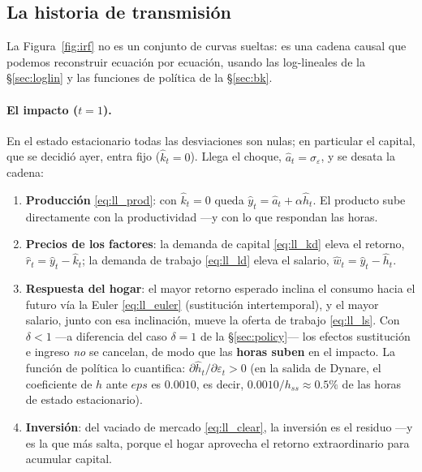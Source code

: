 \documentclass[11pt,a4paper]{report}
\begin{document}
\subsection{La historia de transmisión}

La Figura~\ref{fig:irf} no es un conjunto de curvas sueltas: es una cadena causal
que podemos reconstruir ecuación por ecuación, usando las log-lineales de la
\S\ref{sec:loglin} y las funciones de política de la \S\ref{sec:bk}.

\paragraph{El impacto ($t=1$).} En el estado estacionario todas las desviaciones
son nulas; en particular el capital, que se decidió ayer, entra fijo
($\hat{k}_t=0$). Llega el choque, $\hat{a}_t=\sigma_\varepsilon$, y se desata la
cadena:
\begin{enumerate}[label=(\roman*),nosep,leftmargin=2.2em]
\item \textbf{Producción} \eqref{eq:ll_prod}: con $\hat{k}_t=0$ queda
  $\hat{y}_t=\hat{a}_t+\alpha\hat{h}_t$. El producto sube directamente con la
  productividad ---y con lo que respondan las horas.
\item \textbf{Precios de los factores}: la demanda de capital \eqref{eq:ll_kd}
  eleva el retorno, $\hat{r}_t=\hat{y}_t-\hat{k}_t$; la demanda de trabajo
  \eqref{eq:ll_ld} eleva el salario, $\hat{w}_t=\hat{y}_t-\hat{h}_t$.
\item \textbf{Respuesta del hogar}: el mayor retorno esperado inclina el consumo
  hacia el futuro vía la Euler \eqref{eq:ll_euler} (sustitución intertemporal), y
  el mayor salario, junto con esa inclinación, mueve la oferta de trabajo
  \eqref{eq:ll_ls}. Con $\delta<1$ ---a diferencia del caso $\delta=1$ de la
  \S\ref{sec:policy}--- los efectos sustitución e ingreso \emph{no} se cancelan,
  de modo que las \textbf{horas suben} en el impacto. La función de política lo
  cuantifica: $\partial\hat{h}_t/\partial\varepsilon_t>0$ (en la salida de
  Dynare, el coeficiente de $h$ ante $eps$ es $0.0010$, es decir,
  $0.0010/h_{ss}\approx0.5\%$ de las horas de estado estacionario).
\item \textbf{Inversión}: del vaciado de mercado \eqref{eq:ll_clear}, la
  inversión es el residuo ---y es la que más salta, porque el hogar aprovecha el
  retorno extraordinario para acumular capital.
\end{enumerate}
\end{document}

